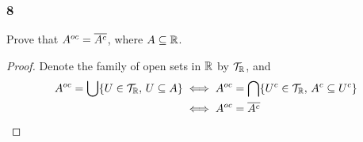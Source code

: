 \documentclass[../main.tex]{subfiles}
\begin{document}
\subsubsection*{8}
\begin{wts}
    Prove that $A^{oc}=\overline{A^c}$, where $A\subseteq\mathbb{R}$.
\end{wts}

\begin{proof}
    Denote the family of open sets in $\mathbb{R}$ by $\mathcal{T}_{\mathbb{R}}$, and
    \begin{align*}
        A^{oc}=\bigcup\{U\in\mathcal{T}_{\mathbb{R}},\,U\subseteq A\}&\iff A^{oc}=\bigcap\{U^c\in\mathcal{T}_{\mathbb{R}},\,A^c\subseteq U^c\}\\
        &\iff A^{oc}=\overline{A^c}
    \end{align*}
\end{proof}
\end{document}
